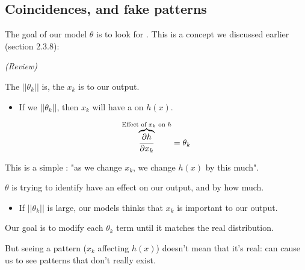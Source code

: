     

    \phantom{}

    \subsection{Coincidences, and fake patterns}

        The goal of our model $\theta$ is to look for . This is a concept we discussed earlier (section 2.3.8):\\

        \begin{concept}
            \textit{(Review)}
            
            The  $||\theta_k||$ is, the  $x_k$ is to our output. 
            

            \begin{itemize}
                \item If we  $||\theta_k||$, then $x_k$ will have a  on $h(x)$.
            \end{itemize}

            \begin{equation*}
                \overbrace{
                \frac{\partial h}{\partial x_k}
                }^{\text{Effect of $x_k$ on $h$}}= 
                \theta_k
            \end{equation*}

            This is a simple : "as we change $x_k$, we change $h(x)$ by this much".
        \end{concept}

        $\theta$ is trying to identify  have an effect on our output, and by how much.

        \begin{itemize}
            \item If $||\theta_k||$ is large, our models thinks that $x_k$ is important to our output.
        \end{itemize}

        Our goal is to modify each $\theta_k$ term until it matches the real distribution.

        

        \phantom{}

        But seeing a pattern ($x_k$ affecting $h(x)$) doesn't mean that it's real:  can cause us to see patterns that don't really exist.

